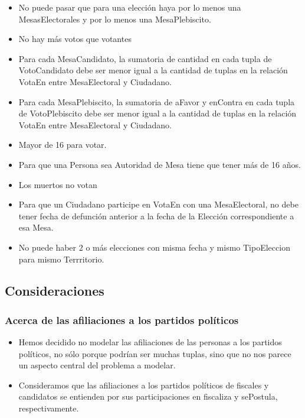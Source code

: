 \begin{itemize}
\item{No puede pasar que para una elección haya por lo menos una  MesasElectorales y por lo menos una MesaPlebiscito.}

\item{No hay más votos que votantes}

\item{Para cada MesaCandidato, la sumatoria de cantidad en cada tupla de VotoCandidato debe ser menor igual a la cantidad de tuplas en la relación VotaEn entre MesaElectoral y Ciudadano.}

\item{Para cada MesaPlebiscito, la sumatoria de aFavor y enContra en cada tupla de VotoPlebiscito debe ser menor igual a la cantidad de tuplas en la relación VotaEn entre MesaElectoral y Ciudadano.}

\item{Mayor de 16 para votar.}

\item{Para que una Persona sea Autoridad de Mesa tiene que tener más de 16 años.}

\item{Los muertos no votan}

\item{Para que un Ciudadano participe en VotaEn con una MesaElectoral, no debe tener fecha de defunción anterior a la fecha de la Elección correspondiente a esa Mesa.}

\item{No puede haber 2 o más  elecciones con misma fecha y mismo TipoEleccion para mismo Terrritorio.}


\end{itemize}


\subsection{Consideraciones}

\subsubsection{Acerca de las afiliaciones a los partidos políticos}

\begin{itemize}
\item{Hemos decidido no modelar las afiliaciones de las personas a los partidos políticos, no sólo porque podrían ser muchas tuplas, sino que no nos parece un aspecto central del problema a modelar.}

\item{Consideramos que las afiliaciones a los partidos políticos de fiscales y candidatos se entienden por sus participaciones en fiscaliza y sePostula, respectivamente.}
\end{itemize}

